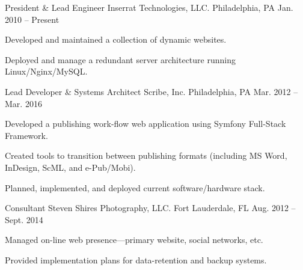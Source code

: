 %
%
%
%



\begin{cventries}

  \cventry
    {President \& Lead Engineer} %
    {Inserrat Technologies, LLC.} %
    {Philadelphia, PA} %
    {Jan. 2010 -- Present} %
    {
      \begin{cvitems} %
        \item {Developed and maintained a collection of dynamic websites.}
        \item {Deployed and manage a redundant server architecture running Linux/Nginx/MySQL.}
      \end{cvitems}
    }

  \cventry
    {Lead Developer \& Systems Architect} %
    {Scribe, Inc.} %
    {Philadelphia, PA} %
    {Mar. 2012 -- Mar. 2016} %
    {
      \begin{cvitems} %
        \item {Developed a publishing work-flow web application using Symfony Full-Stack Framework.}
        \item {Created tools to transition between publishing formats (including MS Word, InDesign, ScML, and e-Pub/Mobi).}
        \item {Planned, implemented, and deployed current software/hardware stack.}
      \end{cvitems}
    }

  \cventry
    {Consultant} %
    {Steven Shires Photography, LLC.} %
    {Fort Lauderdale, FL} %
    {Aug. 2012 -- Sept. 2014} %
    {
      \begin{cvitems} %
        \item {Managed on-line web presence---primary website, social networks, etc.}
        \item {Provided implementation plans for data-retention and backup systems.}
      \end{cvitems}
    }


\end{cventries}

